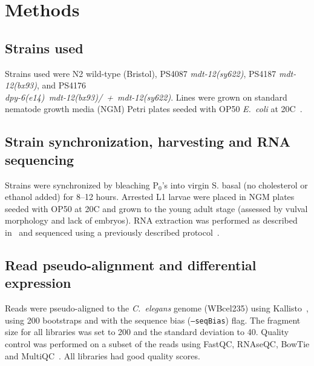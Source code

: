 \documentclass[10pt, twocolumn]{article}
\newcommand{\cel}{\emph{C.~elegans}}
\newcommand{\ecol}{\emph{E.~coli}}
\newcommand{\gene}[1]{\mbox{\emph{#1}}}
\begin{document}
\section*{Methods}
\label{sec:methods}
\subsection*{Strains used}
Strains used were N2 wild-type (Bristol),
PS4087 \gene{mdt-12(sy622)},
PS4187 \gene{mdt-12(bx93)},
and PS4176\\ \gene{dpy-6(e14) mdt-12(bx93)/ + mdt-12(sy622)}.
Lines were grown on standard nematode growth media (NGM) Petri plates seeded
with OP50 \ecol{} at 20\degree{}C~\cite{Brenner1974}.

\subsection*{Strain synchronization, harvesting and RNA sequencing}
Strains were synchronized by bleaching P$_0$'s into virgin S. basal (no
cholesterol or ethanol added) for 8--12 hours. Arrested L1 larvae were placed in
NGM plates seeded with OP50 at 20\degree{}C and grown to the young adult stage
(assessed by vulval morphology and lack of embryos). RNA extraction was
performed as described in~\cite{AngelesAlboresHIF} and sequenced using a
previously described protocol~\cite{Angeles-Albores2017}.

\subsection*{Read pseudo-alignment and differential expression}
Reads were pseudo-aligned to the \cel{} genome (WBcel235) using
Kallisto~\cite{Bray2016}, using 200 bootstraps and with the sequence bias
(\texttt{--seqBias}) flag. The fragment size for all libraries was set to 200
and the standard deviation to 40. Quality control was performed on a subset of
the reads using FastQC, RNAseQC, BowTie and
MultiQC~\cite{Andrews2010,Deluca2012,Langmead2009,Ewels2016}. All libraries had
good quality scores.
\end{document}
